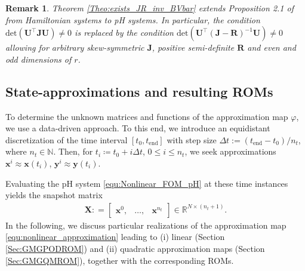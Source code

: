 \documentclass{article}
\newtheorem{remark}[theorem]{Remark}
\newcommand{\bmU}{\bm{U}}
\newcommand{\bmJ}{\bm{J}}
\newcommand{\bmR}{\bm{R}}
\newcommand{\bmX}{\bm{X}}
\newcommand{\R}{\mathbb{R}}
\newcommand{\statex}{{\bm x}}
\newcommand{\outputy}{{\bm y}}
\newcommand{\snapsize}{n_t}
\newcommand{\FOMsize}{N}
\newcommand{\ROMsize}{r}
\newcommand{\approxfunc}{\varphi}
\newcommand{\pH}{\textsf{pH}\xspace}
\newcommand{\ROMs}{\textsf{ROM}s\xspace}
\begin{document}
\begin{remark}
Theorem \ref{Theo:exists_JR_inv_BVbar} extends Proposition 2.1 of \cite{GruberTezaur2025} from Hamiltonian systems to \pH systems. In particular, the condition $\mathrm{det}\left(\bmU^{\top}\bmJ\bmU\right)\neq 0$ is replaced by the condition $\mathrm{det}\left(\bmU^{\top}(\bmJ-\bmR)^{-1}\bmU\right)\neq 0$ allowing for arbitrary skew-symmetric $\bmJ$, positive semi-definite $\bmR$ and even and odd dimensions of $\ROMsize$.
\end{remark}					
								
\subsection{State-approximations and resulting \ROMs} \label{Sec:state-approx_resulting_ROMs}
To determine the unknown matrices and functions of the approximation map $\approxfunc$, we use a data-driven approach. To this end, we introduce an equidistant discretization of the time interval $[t_0, t_{\text{end}}]$ with step size $\Delta t := (t_{\text{end}} - t_0)/\snapsize$, where $\snapsize \in \mathbb{N}$. Then, for $t_i \coloneq  t_0 + i \Delta t $, $0 \le i \le \snapsize$, we seek approximations $\statex^i \approx \statex(t_i)$, $\outputy^i \approx \outputy(t_i)$.

Evaluating the \pH system \eqref{equ:Nonlinear_FOM_pH} at these time instances yields the snapshot matrix   
\begin{align}
\label{equ:snap_mat_difi}
	\bmX : =
	\begin{bmatrix}
		\statex^0,&\ldots,&\statex^{\snapsize} 
	\end{bmatrix}\in\R^{\FOMsize\times (\snapsize+1)}.
\end{align}
In the following, we discuss particular realizations of the approximation map \eqref{equ:nonlinear_approximation}  leading to (i) linear (Section \ref{Sec:GMGPODROM}) and (ii) quadratic approximation maps (Section \ref{Sec:GMGQMROM}), together with the corresponding \ROMs.
								
								
\end{document}
